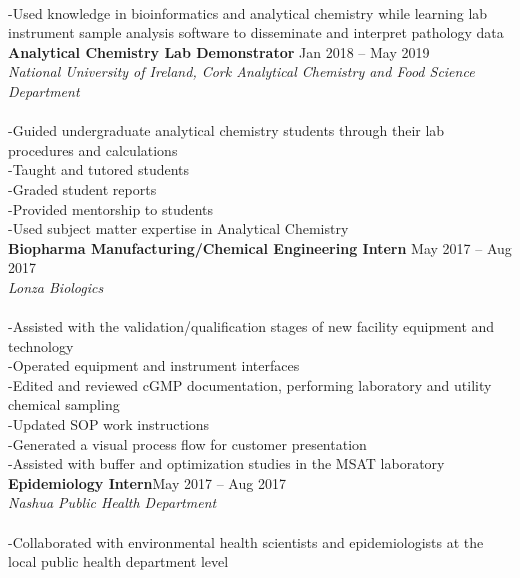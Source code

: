 \documentclass[11pt]{article}
\begin{document}
{{        \\-Used knowledge in bioinformatics and analytical chemistry while learning lab instrument sample analysis software to disseminate and interpret pathology data\\
        } \vspace{10pt}
		\textsf{\textbf{Analytical Chemistry Lab Demonstrator  }\hspace{205pt}Jan 2018 – May 2019  \\ \textit{National University of Ireland, Cork Analytical Chemistry and Food Science Department}\\ \\-Guided undergraduate analytical chemistry students through their lab procedures and calculations
        \\-Taught and tutored students
        \\-Graded student reports
        \\-Provided mentorship to students 
        \\-Used subject matter expertise in Analytical Chemistry\\
        } \vspace{10pt}
		\textsf{\textbf{Biopharma Manufacturing/Chemical Engineering Intern   }\hspace{125pt}May 2017 – Aug 2017   \\ \textit{Lonza Biologics}\\ 
		\\-Assisted with the validation/qualification stages of new facility equipment and technology
        \\-Operated equipment and instrument interfaces
        \\-Edited and reviewed cGMP documentation, performing laboratory and utility chemical sampling
        \\-Updated SOP work instructions
        \\-Generated a visual process flow for customer presentation
        \\-Assisted with buffer and optimization studies in the MSAT laboratory\\
        } \vspace{10pt}		
		\textsf{\textbf{Epidemiology Intern}\hspace{305pt}May 2017 – Aug 2017   \\ \textit{Nashua Public Health Department}\\
		\\-Collaborated with environmental health scientists and epidemiologists at the local public health department level
}}
\end{document}
